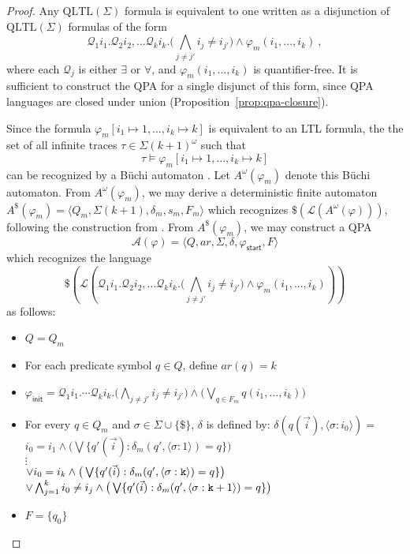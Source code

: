\documentclass[9pt,nocopyrightspace]{sigplanconf}
\theoremstyle{definition}
\newcommand{\tuple}[1]{\langle #1 \rangle}
\newcommand{\idx}[1]{\text{\rm\texttt{#1}}}
\newcommand{\ic}[2]{{\tuple{#1 : #2}}}
\newcommand{\init}{\textsf{init}}
\newcommand{\lang}{\mathcal{L}}
\newcommand{\start}{\mathsf{start}}
\renewcommand{\phi}{\varphi}
\newcommand{\ar}{\textit{ar}}
\newcommand{\itrace}{infinite trace}
\newcommand{\iSigma}[1]{\Sigma(#1)}
\newcommand{\QLTL}{\text{QLTL}}
\begin{document}
\thmqltl*
\begin{proof}
  Any $\QLTL(\Sigma)$ formula is equivalent to one written as a disjunction of
  $\QLTL(\Sigma)$ formulas of the form \[\mathcal{Q}_1 i_1. \mathcal{Q}_2
  i_2,... \mathcal{Q}_k i_{k}. \big(\bigwedge_{j\neq j'} i_j \neq i_{j'}\big)
  \land \phi_m(i_1,...,i_k)\ ,\] where each $\mathcal{Q}_j$ is either
  $\exists$ or $\forall$, and $\phi_m(i_1,...,i_k)$ is quantifier-free.  It is
  sufficient to construct the QPA for a single disjunct of this form, since
  QPA languages are closed under union (Proposition~\ref{prop:qpa-closure}).

  Since the formula $\phi_m[i_1 \mapsto
    1, \ldots, i_k \mapsto k]$ is equivalent to an LTL formula, the
  the set of all \itrace{}s $\tau \in \Sigma(k+1)^\omega$ such that
  \[\tau \models \phi_m[i_1 \mapsto 1, \ldots, i_k \mapsto k]\] can be
  recognized by a B\"{u}chi automaton \cite{Vardi1994}.  Let
  $A^\omega(\phi_m)$ denote this B\"{u}chi automaton.  From
  $A^\omega(\phi_m)$, we may derive a deterministic finite automaton
  $A^\$(\phi_m) = \tuple{Q_m,\iSigma{k+1},\delta_m,s_m,F_m}$ which recognizes
  $\$(\lang(A^\omega(\phi)))$, following the construction from
  \cite{Calbrix1993}.  From $A^\$(\phi_m)$, we may construct a
  QPA \[\mathcal{A}(\phi) = \tuple{Q,\ar,\Sigma,\delta,\phi_\start,F}\] which
  recognizes the language
  \[\$(\lang(\mathcal{Q}_1 i_1. \mathcal{Q}_2 i_2,... \mathcal{Q}_k
  i_k. \big(\bigwedge_{j\neq j'} i_j \neq i_{j'}\big) \land
  \phi_m(i_1,...,i_k)))\] as follows:
  \begin{itemize}
  \item $Q = Q_m$
  \item For each predicate symbol $q \in Q$, define $\ar(q) = k$
  \item $\phi_\init = \mathcal{Q}_1 i_1. \dotsi \mathcal{Q}_k i_k. \big(\bigwedge_{j\neq j'} i_j \neq i_{j'}\big) \land \big(\bigvee_{q \in F_m} q(i_1,...,i_k)\big)$
  \item For every $q \in Q_m$ and $\sigma \in \Sigma \cup \{\$\}$, $\delta$ is defined by:
    {\small
      $\delta(q(\vec{i}), \ic{\sigma}{i_0}) =$\hfill$i_0 = i_1 \land \big(\bigvee \{ q'(\vec{i}) : \delta_m(q',\ic{\sigma}{1}) = q \}\big)$\\
      \null\hfill$\vdots$\hfill\null\\
      \null\hfill$\lor i_0 = i_k \land \big(\bigvee \{q'(\vec{i}) : \delta_m(q',\ic{\sigma}{\idx{k}}) = q \}\big)$\\
      \null\hfill$\lor \bigwedge_{j = 1}^k i_0 \neq i_j \land \big(\bigvee \{q'(\vec{i}) : \delta_m(q',\ic{\sigma}{\idx{k}+1}) = q \}\big)$
    }
  \item $F = \{q_0\}$ \qedhere
  \end{itemize}
\end{proof}
\end{document}

